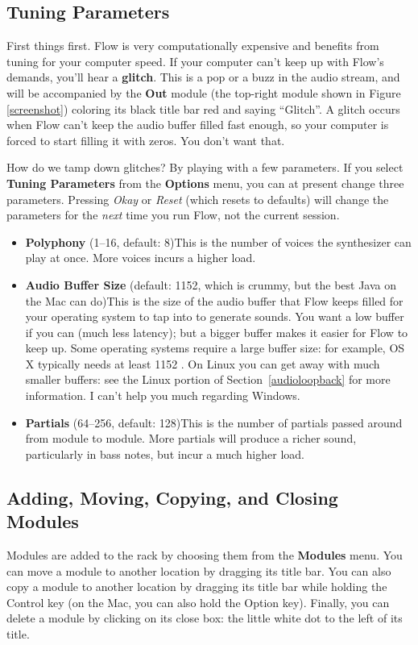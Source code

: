 \documentclass{article}
\newcommand\name{Flow}
\begin{document}
\subsection{Tuning Parameters}
First things first.  {\name} is very computationally expensive and benefits from tuning for your computer speed.  If your computer can't keep up with Flow's demands, you'll hear a {\bf glitch}.  This is a pop or a buzz in the audio stream, and will be accompanied by the {\bf Out} module (the top-right module shown in Figure \ref{screenshot}) coloring its black title bar red and saying ``Glitch''.  A glitch occurs when Flow can't keep the audio buffer filled fast enough, so your computer is forced to start filling it with zeros.  You don't want that.

How do we tamp down glitches?  By playing with a few parameters. If you select {\bf Tuning Parameters} from the {\bf Options} menu, you can at present change three parameters.  Pressing {\it Okay} or {\it Reset} (which resets to defaults) will change the parameters for the {\it next} time you run {\name}, not the current session. 

\begin{itemize}
\item {\bf Polyphony} (1--16, default: 8)\qquad This is the number of voices the synthesizer can play at once.  More voices incurs a higher load.
\item {\bf Audio Buffer Size} (default: 1152, which is crummy, but the best Java on the Mac can do)\qquad This is the size of the audio buffer that {\name} keeps filled for your operating system to tap into to generate sounds.  You want a low buffer if you can (much less latency); but a bigger buffer makes it easier for Flow to keep up.  Some operating systems require a large buffer size: for example, OS X typically needs at least 1152 . On Linux you can get away with much smaller buffers: see the Linux portion of Section~\ref{audioloopback} for more information.  I can't help you much regarding Windows.

\item {\bf Partials} (64--256, default: 128)\qquad This is the number of partials passed around from module to module.  More partials will produce a richer sound, particularly in bass notes, but incur a much higher load.
\end{itemize}


\subsection{Adding, Moving, Copying, and Closing Modules}  Modules are added to the rack by choosing them from the {\bf Modules} menu.  You can move a module to another location by dragging its title bar.  You can also copy a module to another location by dragging its title bar while holding the Control key (on the Mac, you can also hold the Option key).  Finally, you can delete a module by clicking on its close box: the little white dot to the left of its title.
\end{document}

